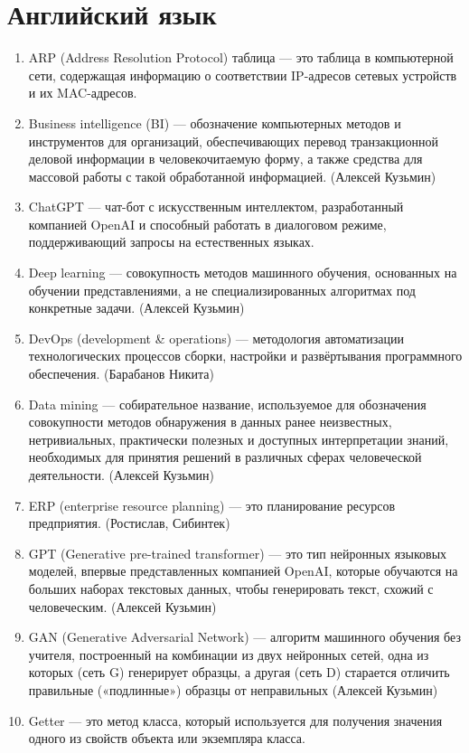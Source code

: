 \documentclass{article}
\begin{document}
\section{Английский язык}
\begin{enumerate}
    \item ARP (Address Resolution Protocol) таблица --- это таблица в компьютерной сети, содержащая информацию о соответствии IP-адресов сетевых устройств и их MAC-адресов. 
    \item Business intelligence (BI) --- обозначение компьютерных методов и инструментов для организаций, обеспечивающих перевод транзакционной деловой информации в человекочитаемую форму, а также средства для массовой работы с такой обработанной информацией. (Алексей Кузьмин)
    \item ChatGPT --- чат-бот с искусственным интеллектом, разработанный компанией OpenAI и способный работать в диалоговом режиме, поддерживающий запросы на естественных языках.
    \item Deep learning  --- совокупность методов машинного обучения, основанных на обучении представлениями, а не специализированных алгоритмах под конкретные задачи. (Алексей Кузьмин)
    \item DevOps (development & operations) --- методология автоматизации технологических процессов сборки, настройки и развёртывания программного обеспечения. (Барабанов Никита)
    \item Data mining --- собирательное название, используемое для обозначения совокупности методов обнаружения в данных ранее неизвестных, нетривиальных, практически полезных и доступных интерпретации знаний, необходимых для принятия решений в различных сферах человеческой деятельности. (Алексей Кузьмин)
    \item ERP (enterprise resource planning) --- это планирование ресурсов предприятия. (Ростислав, Сибинтек)
    \item GPT (Generative pre-trained transformer) --- это тип нейронных языковых моделей, впервые представленных компанией OpenAI, которые обучаются на больших наборах текстовых данных, чтобы генерировать текст, схожий с человеческим. (Алексей Кузьмин)
    \item GAN (Generative Adversarial Network) --- алгоритм машинного обучения без учителя, построенный на комбинации из двух нейронных сетей, одна из которых (сеть G) генерирует образцы, а другая (сеть D) старается отличить правильные («подлинные») образцы от неправильных (Алексей Кузьмин)
    \item Getter --- это метод класса, который используется для получения значения одного из свойств объекта или экземпляра класса.

\end{enumerate}
\end{document}
